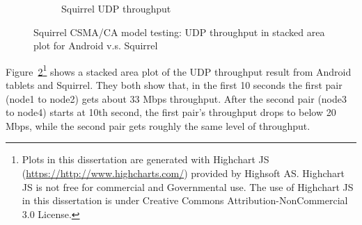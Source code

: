 \documentclass[12pt]{report}
\begin{document}
\begin{figure}[h]
\begin{center}
\begin{subfigure}[h]{\textwidth}
      \caption{\label{fig:squirrel_preliminary_squirrel}Squirrel UDP throughput}
    \end{subfigure}
    \caption{\label{fig:squirrel_preliminary}Squirrel CSMA/CA model testing: UDP throughput in stacked area plot for Android v.s. Squirrel}
  \end{center}
\end{figure}

Figure~\ref{fig:squirrel_preliminary}\footnote{Plots in this dissertation are generated with Highchart JS (\url{https://http://www.highcharts.com/}) provided by Highsoft AS. Highchart JS is not free for commercial and Governmental use. The use of Highchart JS in this dissertation is under Creative Commons Attribution-NonCommercial 3.0 License.} shows a stacked area plot of the UDP throughput result from Android tablets and Squirrel. They both show that, in the first 10 seconds the first pair (node1 to node2) gets about 33 Mbps throughput. After the second pair (node3 to node4) starts at 10th second, the first pair's throughput drops to below 20 Mbps, while the second pair gets roughly the same level of throughput.
\end{document}
